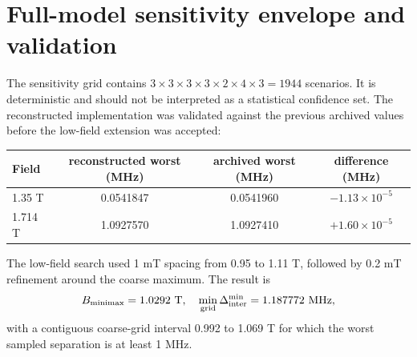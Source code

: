 \documentclass[11pt]{article}
\newcommand{\DeltaInter}{\Delta_{\mathrm{inter}}^{\min}}
\begin{document}
\section{Full-model sensitivity envelope and validation}
The sensitivity grid contains $3\times3\times3\times3\times2\times4\times3=1944$ scenarios. It is deterministic and should not be interpreted as a statistical confidence set. The reconstructed implementation was validated against the previous archived values before the low-field extension was accepted:
\begin{center}
\begin{tabular}{lccc}
\toprule
Field & reconstructed worst (MHz) & archived worst (MHz) & difference (MHz)\\
\midrule
1.35 T & 0.0541847 & 0.0541960 & $-1.13\times10^{-5}$\\
1.714 T & 1.0927570 & 1.0927410 & $+1.60\times10^{-5}$\\
\bottomrule
\end{tabular}
\end{center}
The low-field search used 1 mT spacing from 0.95 to 1.11 T, followed by 0.2 mT refinement around the coarse maximum. The result is
\begin{equation}
B_{\rm minimax}=1.0292\ {\rm T},\quad
\min_{\rm grid}\DeltaInter=1.187772\ {\rm MHz},
\end{equation}
with a contiguous coarse-grid interval 0.992 to 1.069 T for which the worst sampled separation is at least 1 MHz.
\end{document}
